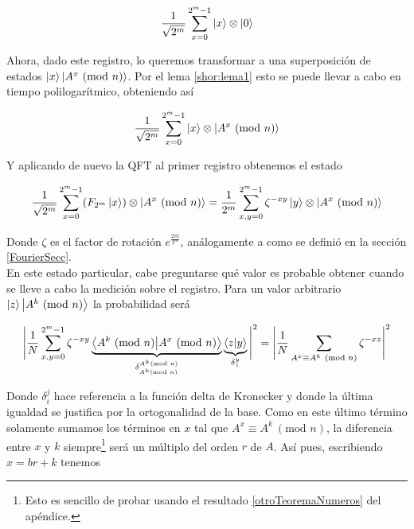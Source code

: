 \documentclass[11pt, spanish]{report}
\numberwithin{equation}{section}
\numberwithin{defin}{section}
\begin{document}
\begin{equation}
\frac{1}{\sqrt{2^m}}\sum_{x=0}^{2^m-1} \ket{x}\otimes\ket{0}
\end{equation}

Ahora, dado este registro, lo queremos transformar a una superposición de estados $\ket{x}\ket{A^x\ (\text{mod }n)}$. Por el lema \ref{shor:lema1} esto se puede llevar a cabo en tiempo polilogarítmico, obteniendo así

\begin{equation}
\frac{1}{\sqrt{2^m}}\sum_{x=0}^{2^m-1} \ket{x}\otimes\ket{A^x\ (\text{mod }n)}
\end{equation}

Y aplicando de nuevo la QFT al primer registro obtenemos el estado

\begin{equation}
\frac{1}{\sqrt{2^m}}\sum_{x=0}^{2^m-1} (F_{2^m}\ket{x})\otimes\ket{A^x\ (\text{mod }n)}=\frac{1}{2^m}\sum_{x,y=0}^{2^m-1}\zeta^{-xy}\ket{y}\otimes\ket{A^x\ (\text{mod }n)}
\end{equation}

Donde $\zeta$ es el factor de rotación $e^{\frac{2\pi i}{2^m}}$, análogamente a como se definió en la sección \ref{FourierSecc}.\\

En este estado particular, cabe preguntarse qué valor es probable obtener cuando se lleve a cabo la medición sobre el registro. Para un valor arbitrario $\ket{z}\ket{A^k\ (\text{mod }n)}$ la probabilidad será\footnotemark{}


\begin{equation}
\begin{split}
\Bigg|\frac{1}{N}\sum_{x,y=0}^{2^m-1}\zeta^{-xy}\underbrace{\bra{A^k\ (\text{mod }n)}\ket{A^x\ (\text{mod }n)}}_{\delta_{A^k (\text{mod }n)}^{A^k (\text{mod }n)}}\underbrace{\bra{z}\ket{y}}_{\delta_z^y}\Bigg|^2=\Bigg|\frac{1}{N}\sum_{A^x\equiv A^k\ (\text{mod }n)}\zeta^{-xz}\Bigg|^2
\end{split}
\end{equation}

Donde $\delta_i^j$ hace referencia a la función delta de Kronecker y donde la última igualdad se justifica por la ortogonalidad de la base. Como en este último término solamente sumamos los términos en $x$ tal que $A^x\equiv A^k\ (\text{mod }n)$, la  diferencia entre $x$ y $k$ siempre\footnote{Esto es sencillo de probar usando el resultado \ref{otroTeoremaNumeros} del apéndice.} será un múltiplo del orden $r$ de $A$. Así pues, escribiendo $x=br+k$ tenemos
\end{document}
